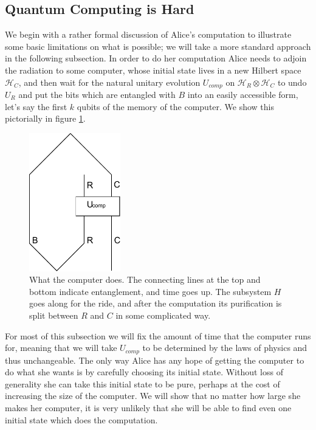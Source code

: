 \documentclass[12pt]{article}
\newcommand{\HR}{\mathcal{H}_R}
\begin{document}
\subsection{Quantum Computing is Hard}\label{bigcompsect}
We begin with a rather formal discussion of Alice's computation to illustrate some basic limitations on what is possible; we will take a more standard approach in the following subsection.
In order to do her computation Alice needs to adjoin the radiation to some computer, whose initial state lives in a new Hilbert space $\mathcal{H}_C$, and then wait for the natural unitary evolution $U_{comp}$ on $\HR\otimes\mathcal{H}_C$ to undo $U_R$ and put the bits which are entangled with $B$ into an easily accessible form, let's say the first $k$ qubits of the memory of the computer.  We show this pictorially in figure \ref{bigcomp}.
\begin{figure}
\begin{center}
\includegraphics[height=6cm]{bigcomp.pdf}
\end{center}
\caption{What the computer does.  The connecting lines at the top and bottom indicate entanglement, and time goes up.  The subsystem $H$ goes along for the ride, and after the computation its purification is split between $R$ and $C$ in some complicated way.}\label{bigcomp}
\end{figure}
For most of this subsection we will fix the amount of time that the computer runs for, meaning that we will take $U_{comp}$ to be determined by the laws of physics and thus unchangeable.  The only way Alice has any hope of getting the computer to do what she wants is by carefully choosing its initial state.  Without loss of generality she can take this initial state to be pure, perhaps at the cost of increasing the size of the computer.  We will show that no matter how large she makes her computer, it is very unlikely that she will be able to find even one initial state which does the computation.  
\end{document}
